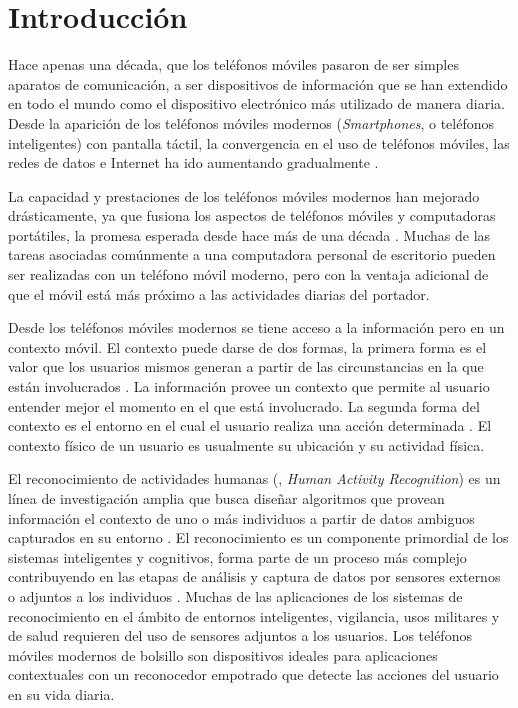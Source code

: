 
\chapter{Introducción}

\label{chap1:introduccion}

Hace apenas una década, que los teléfonos móviles pasaron de ser simples
aparatos de comunicación, a ser dispositivos de información que se
han extendido en todo el mundo como el dispositivo electrónico más
utilizado de manera diaria. Desde la aparición de los teléfonos móviles
modernos (\emph{Smartphones}, o teléfonos inteligentes) con pantalla
táctil, la convergencia en el uso de teléfonos móviles, las redes
de datos e Internet ha ido aumentando gradualmente \cite{Fling2009}.

La capacidad y prestaciones de los teléfonos móviles modernos han
mejorado drásticamente, ya que fusiona los aspectos de teléfonos móviles
y computadoras portátiles, la promesa esperada desde hace más de una
década \cite{Tanenbaum2010}. Muchas de las tareas asociadas comúnmente
a una computadora personal de escritorio pueden ser realizadas con
un teléfono móvil moderno, pero con la ventaja adicional de que el
móvil está más próximo a las actividades diarias del portador.

Desde los teléfonos móviles modernos se tiene acceso a la información
pero en un contexto móvil. El contexto puede darse de dos formas,
la primera forma es el valor que los usuarios mismos generan a partir
de las circunstancias en la que están involucrados \cite{Fling2009}.
La información provee un contexto que permite al usuario entender
mejor el momento en el que está involucrado. La segunda forma del
contexto es el entorno en el cual el usuario realiza una acción determinada
\cite{Fling2009}. El contexto físico de un usuario es usualmente
su ubicación y su actividad física. 

El reconocimiento de actividades humanas (, \emph{Human
Activity Recognition}) es un línea de investigación amplia que busca
diseñar algoritmos que provean información el contexto de uno o más
individuos a partir de datos ambiguos capturados en su entorno \cite{Bao2004}.
El reconocimiento es un componente primordial de los sistemas inteligentes
y cognitivos, forma parte de un proceso más complejo contribuyendo
en las etapas de análisis y captura de datos por sensores externos
o adjuntos a los individuos \cite{ReyesOrtiz2015,Chen2012}. Muchas
de las aplicaciones de los sistemas de reconocimiento en el ámbito
de entornos inteligentes, vigilancia, usos militares y de salud requieren
del uso de sensores adjuntos a los usuarios. Los teléfonos móviles
modernos de bolsillo son dispositivos ideales para aplicaciones contextuales
con un reconocedor empotrado que detecte las acciones del usuario
en su vida diaria. 

